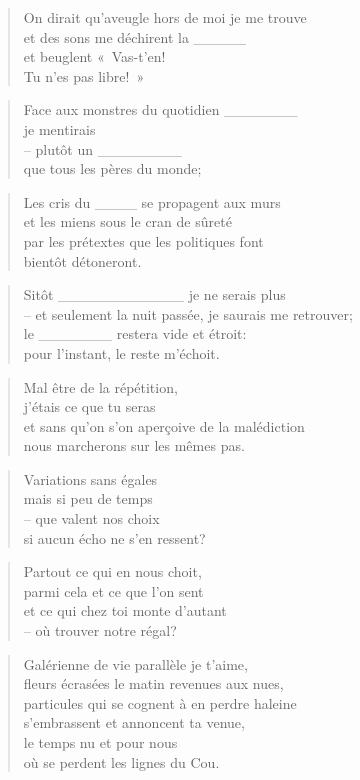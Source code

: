   \begin{verse}
    On dirait qu’aveugle hors de moi je me trouve\\
    et des sons me déchirent la \_\_\_\_\_\\
    et beuglent «~Vas-t’en!\\
    Tu n’es pas libre!~»
  \end{verse}
  \begin{verse}
    Face aux monstres du quotidien \_\_\_\_\_\_\_\\
    je mentirais\\
    -- plutôt un \_\_\_\_\_\_\_\_\\
    que tous les pères du monde;
  \end{verse}
  \begin{verse}
    Les cris du \_\_\_\_ se propagent aux murs\\
    et les miens sous le cran de sûreté\\
    par les prétextes que les politiques font\\
    bientôt détoneront.
  \end{verse}
  \begin{verse}
    Sitôt \_\_\_\_\_\_\_\_\_\_\_\_ je ne serais plus\\
    -- et seulement la nuit passée, je saurais me retrouver;\\
    le \_\_\_\_\_\_\_ restera vide et étroit:\\
    pour l’instant, le reste m’échoit.
  \end{verse}
  \begin{verse}
    Mal être de la répétition,\\
    j’étais ce que tu seras\\
    et sans qu’on s’on aperçoive de la malédiction\\
    nous marcherons sur les mêmes pas.
  \end{verse}
  \begin{verse}
    Variations sans égales\\
    mais si peu de temps\\
    -- que valent nos choix\\
    si aucun écho ne s’en ressent?
  \end{verse}
  \begin{verse}
    Partout ce qui en nous choit,\\
    parmi cela et ce que l’on sent\\
    et ce qui chez toi monte d’autant\\
    -- où trouver notre régal?
  \end{verse}
  \begin{verse}
    Galérienne de vie parallèle je t’aime,\\
    fleurs écrasées le matin revenues aux nues,\\
    particules qui se cognent à en perdre haleine\\
    s’embrassent et annoncent ta venue,\\
    le temps nu et pour nous\\
    où se perdent les lignes du Cou.
  \end{verse}

